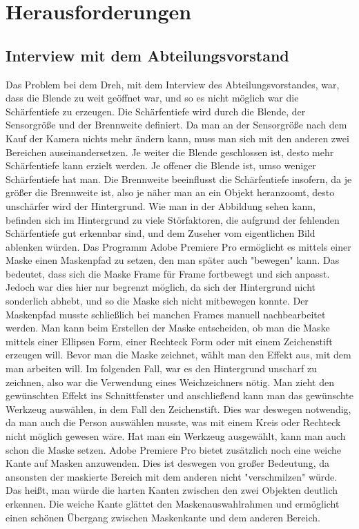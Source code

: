 \section{Herausforderungen}
\subsection{Interview mit dem Abteilungsvorstand}
Das Problem bei dem Dreh, mit dem Interview des Abteilungsvorstandes, war, dass die Blende zu weit geöffnet war, und so es nicht möglich war die Schärfentiefe zu erzeugen. Die Schärfentiefe wird durch die Blende, der Sensorgröße und der Brennweite definiert. Da man an der Sensorgröße nach dem Kauf der Kamera nichts mehr ändern kann, muss man sich mit den anderen zwei Bereichen auseinandersetzen. Je weiter die Blende geschlossen ist, desto mehr Schärfentiefe kann erzielt werden. Je offener die Blende ist, umso weniger Schärfentiefe hat man. Die Brennweite beeinflusst die Schärfentiefe insofern, da je größer die Brennweite ist, also je näher man an ein Objekt heranzoomt, desto unschärfer wird der Hintergrund. 
Wie man in der Abbildung sehen kann, befinden sich im Hintergrund zu viele Störfaktoren, die aufgrund der fehlenden Schärfentiefe gut erkennbar sind, und dem Zuseher vom eigentlichen Bild ablenken würden. 
Das Programm Adobe Premiere Pro ermöglicht es mittels einer Maske einen Maskenpfad zu setzen, den man später auch "bewegen" kann. Das bedeutet, dass sich die Maske Frame für Frame fortbewegt und sich anpasst. Jedoch war dies hier nur begrenzt möglich, da sich der Hintergrund nicht sonderlich abhebt, und so die Maske sich nicht mitbewegen konnte. Der Maskenpfad musste schließlich bei manchen Frames manuell nachbearbeitet werden.
Man kann beim Erstellen der Maske entscheiden, ob man die Maske mittels einer Ellipsen Form, einer Rechteck Form oder mit einem Zeichenstift erzeugen will. Bevor man die Maske zeichnet, wählt man den Effekt aus, mit dem man arbeiten will. Im folgenden Fall, war es den Hintergrund unscharf zu zeichnen, also war die Verwendung eines Weichzeichners nötig. Man zieht den gewünschten Effekt ins Schnittfenster und anschließend kann man das gewünschte Werkzeug auswählen, in dem Fall den Zeichenstift. Dies war deswegen notwendig, da man auch die Person auswählen musste, was mit einem Kreis oder Rechteck nicht möglich gewesen wäre. Hat man ein Werkzeug ausgewählt, kann man auch schon die Maske setzen. Adobe Premiere Pro bietet zusätzlich noch eine weiche Kante auf Masken anzuwenden. Dies ist deswegen von großer Bedeutung, da ansonsten der maskierte Bereich mit dem anderen nicht "verschmilzen" würde. Das heißt, man würde die harten Kanten zwischen den zwei Objekten deutlich erkennen. Die weiche Kante glättet den Maskenauswahlrahmen und ermöglicht einen schönen Übergang zwischen Maskenkante und dem anderen Bereich.
